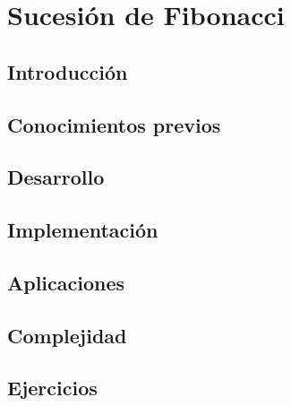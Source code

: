 
\chapter{Sucesión de Fibonacci}
\section{Introducción}

\section{Conocimientos previos}

\section{Desarrollo}

\section{Implementación}

\section{Aplicaciones}

\section{Complejidad}

\section{Ejercicios}
